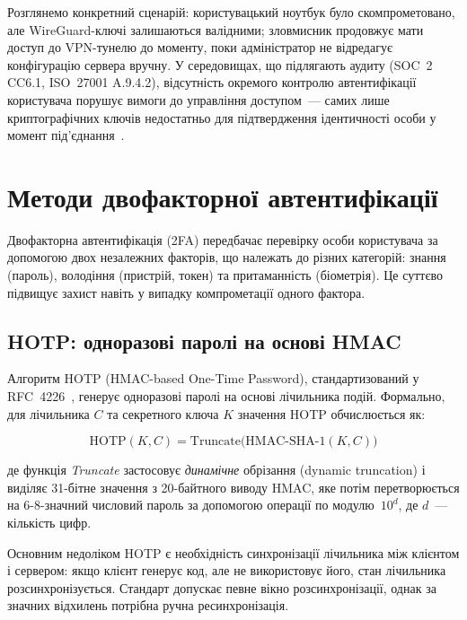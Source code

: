 Розглянемо конкретний сценарій: користувацький ноутбук було скомпрометовано,
але WireGuard-ключі залишаються валідними; зловмисник продовжує мати доступ до
VPN-тунелю до моменту, поки адміністратор не відредагує конфігурацію сервера
вручну. У середовищах, що підлягають аудиту (SOC~2 CC6.1, ISO~27001 A.9.4.2),
відсутність окремого контролю автентифікації користувача порушує вимоги до
управління доступом~--- самих лише криптографічних ключів недостатньо для
підтвердження ідентичності особи у момент під'єднання~\cite{wireguard_limitations}.

\section{Методи двофакторної автентифікації}

Двофакторна автентифікація (2FA) передбачає перевірку особи користувача
за допомогою двох незалежних факторів, що належать до різних категорій:
знання (пароль), володіння (пристрій, токен) та притаманність (біометрія).
Це суттєво підвищує захист навіть у випадку компрометації одного фактора.

\subsection{HOTP: одноразові паролі на основі HMAC}

Алгоритм HOTP (HMAC-based One-Time Password), стандартизований у RFC~4226~\cite{rfc4226},
генерує одноразові паролі на основі лічильника подій. Формально,
для лічильника $C$ та секретного ключа $K$ значення HOTP обчислюється як:

\begin{equation}
\text{HOTP}(K, C) = \text{Truncate}\bigl(\text{HMAC-SHA-1}(K, C)\bigr)
\label{eq:hotp}
\end{equation}

де функція \textit{Truncate} застосовує \textit{динамічне} обрізання (dynamic
truncation) і виділяє 31-бітне значення з 20-байтного виводу HMAC, яке потім
перетворюється на 6-8-значний числовий
пароль за допомогою операції по модулю~$10^d$, де $d$~--- кількість цифр.

Основним недоліком HOTP є необхідність синхронізації лічильника між клієнтом
і сервером: якщо клієнт генерує код, але не використовує його, стан лічильника
розсинхронізується. Стандарт допускає певне вікно розсинхронізації, однак
за значних відхилень потрібна ручна ресинхронізація.


